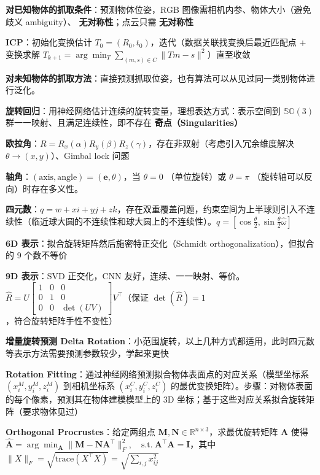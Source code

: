 \documentclass[
  8pt]{extarticle}
\begin{document}
\begin{multicols*}{4}
\textbf{对已知物体的抓取条件}：预测物体位姿，RGB
图像需相机内参、物体大小（避免歧义 ambiguity）、
\textbf{无对称性}；点云只需 \textbf{无对称性}

\textbf{ICP}：初始化变换估计
\(T_0 = (R_0, t_0)\)，迭代（数据关联找变换后最近匹配点 + 变换求解
\(T_{k+1} = \arg \min_T \sum_{(m,s) \in C} \| Tm - s \|^2\)）直至收敛

\textbf{对未知物体的抓取方法}：直接预测抓取位姿，也有算法可以从见过同一类别物体进行泛化。

\textbf{旋转回归}：用神经网络估计连续的旋转变量，理想表达方式：表示空间到
\(\mathbb{SO}(3)\) 群一一映射、且满足连续性，即不存在
\textbf{奇点（Singularities）}

\textbf{欧拉角}：\(R = R_x(\alpha)R_y(\beta)R_z(\gamma)\)，存在非双射（考虑引入冗余维度解决
\(\theta \to (x,y)\)）、Gimbal lock 问题

\textbf{轴角}：\((\text{axis}, \text{angle}) = (\mathbf{e}, \theta)\)，当
\(\theta=0\) （单位旋转）或 \(\theta=\pi\)
（旋转轴可以反向）时存在多义性。

\textbf{四元数}：\(q = w + xi + yj + zk\)，存在双重覆盖问题，约束空间为上半球则引入不连续性（临近球大圆的不连续性和球大圆上的不连续性）。\(q = \left[\cos\frac{\theta}{2}, \sin\frac{\theta}{2} \hat{\omega}\right]\)

\textbf{6D 表示}：拟合旋转矩阵然后施密特正交化（Schmidt
orthogonalization），但拟合的 9 个数不等价

\textbf{9D 表示}：SVD 正交化，CNN
友好，连续、一一映射、等价。\(\hat{R} = U\begin{bmatrix} 1 & 0 & 0 \\ 0 & 1 & 0 \\ 0 & 0 & \det(UV) \end{bmatrix}V^{\top}\)（保证
\(\det(\hat{R}) = 1\)，符合旋转矩阵手性不变性）

\textbf{增量旋转预测 Delta
Rotation}：小范围旋转，以上几种方式都适用，此时四元数等表示方法需要预测参数较少，学起来更快

\textbf{Rotation
Fitting}：通过神经网络预测拟合物体表面点的对应关系（模型坐标系
\((x_i^M, y_i^M, z_i^M)\) 到相机坐标系 \((x_i^C, y_i^C, z_i^C)\)
的最优变换矩阵）。步骤：对物体表面的每个像素，预测其在物体建模模型上的
3D 坐标；基于这些对应关系拟合旋转矩阵（要求物体见过）

\textbf{Orthogonal Procrustes}：给定两组点
\(\mathbf{M}, \mathbf{N} \in \mathbb{R}^{n \times 3}\)，求最优旋转矩阵
\(\mathbf{A}\) 使得
\(\hat{\mathbf{A}} = \arg\min_{\mathbf{A}} \|\mathbf{M} - \mathbf{N}\mathbf{A}^\top\|_F^2, \quad \text{s.t.}~\mathbf{A}^\top\mathbf{A} = \mathbf{I}\)，其中
\(\|X\|_F = \sqrt{\text{trace}(X^{\top}X)} = \sqrt{\sum_{i,j} x_{ij}^2}\)


\end{multicols*}
\end{document}
